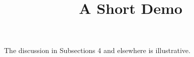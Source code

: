 \documentclass[article]{jss}
\title{A Short Demo}
\begin{document}
The discussion in Subsections 4 and elsewhere is illustrative.
\end{document}
